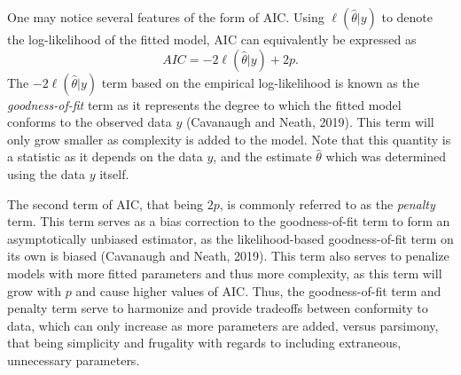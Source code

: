 		One may notice several features of the form of AIC. Using $\ell(\hat{\theta}|y)$ to denote the log-likelihood of the fitted model, AIC can equivalently be expressed as
		\begin{equation*}
			AIC = -2 \ell(\hat{\theta}|y) + 2 p.
		\end{equation*}
		The $-2 \ell(\hat{\theta}|y)$ term based on the empirical log-likelihood is known as the \textit{goodness-of-fit} term as it represents the degree to which the fitted model
		conforms to the observed data $y$ (Cavanaugh and Neath, 2019). This term will only grow smaller as complexity is added to the model. Note that this quantity is
		a statistic as it depends on the data $y$, and the estimate $\hat{\theta}$ which was determined using the data $y$ itself.

		The second term of AIC, that being $2 p$, is commonly referred to as the \textit{penalty} term. This term serves as a bias correction to the goodness-of-fit term to form an asymptotically
		unbiased estimator, as the likelihood-based goodness-of-fit term on its own is biased (Cavanaugh and Neath, 2019). This term also serves to penalize models with more fitted parameters and
		thus more complexity, as this term will grow with $p$ and cause higher values of AIC. Thus, the goodness-of-fit term and penalty term serve to harmonize and provide tradeoffs between
		conformity to data, which can only increase as more parameters are added, versus parsimony, that being simplicity and frugality with regards to including extraneous, unnecessary
		parameters.

